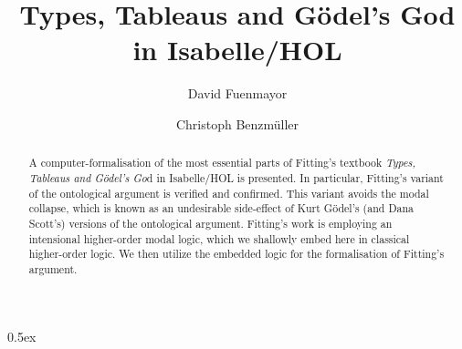 \documentclass[11pt,a4paper]{article}
\begin{document}
\title{Types, Tableaus and G\"odel's God \\ in Isabelle/HOL}
\author[1]{David Fuenmayor}
\author[2]{Christoph Benzm\"uller}

\maketitle

\begin{abstract}
  A computer-formalisation of the most essential parts of Fitting's textbook
  \emph{Types, Tableaus and G\"odel's Go}d in Isabelle/HOL is
  presented. In particular, Fitting's variant of the ontological
  argument is verified and confirmed. This variant avoids the modal
  collapse, which is known as an undesirable side-effect of Kurt G\"odel's (and
  Dana Scott's) versions of the ontological argument. Fitting's work
  is employing an intensional higher-order modal logic, which we
  shallowly embed here in classical higher-order logic. We then
  utilize the embedded logic for the formalisation of Fitting's argument.
\end{abstract}

\tableofcontents

\parindent 0pt\parskip 0.5ex





\end{document}
